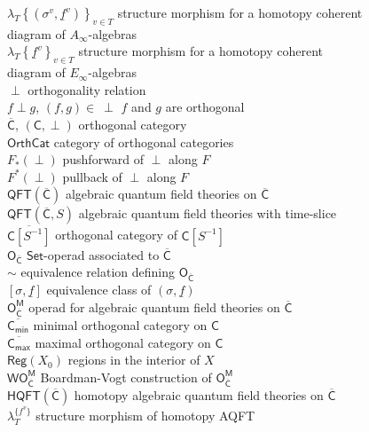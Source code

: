 \documentclass[11pt]{amsbook}
\numberwithin{section}{chapter}
\numberwithin{subsection}{section}
\numberwithin{equation}{section}
\theoremstyle{plain}
\theoremstyle{definition}
\newcommand{\C}{\mathsf{C}}
\newcommand{\M}{\mathsf{M}}
\renewcommand{\O}{\mathsf{O}}
\newcommand{\W}{\mathsf{W}}
\newcommand{\inv}[1]{{#1}^{-1}}
\newcommand{\perpen}{~\perp}
\newcommand{\Cbar}{\overline{\C}}
\newcommand{\Cbarmin}{\overline{\C_{\mathsf{min}}}}
\newcommand{\Cbarmax}{\overline{\C_{\mathsf{max}}}}
\newcommand{\Csinv}{\C[\inv{S}]}
\newcommand{\Csinvbar}{\overline{\Csinv}}
\newcommand{\Ocbar}{\O_{\Cbar}}
\newcommand{\Ocbarm}{\Ocbar^{\M}}
\newcommand{\Orthcat}{\mathsf{OrthCat}}
\newcommand{\QFT}{\mathsf{QFT}}
\newcommand{\HQFT}{\mathsf{HQFT}}
\newcommand{\Reg}{\mathsf{Reg}}
\newcommand{\Regxzero}{\Reg(X_0)}
\newcommand{\Set}{\mathsf{Set}}
\newcommand{\wocbarm}{\W\Ocbarm}
\newcommand{\uf}{\underline f}
\begin{document}
\begin{tabbing}
$\lambda_T\left\{(\sigma^v,\uf^v)\right\}_{v\in T}$  structure morphism for a homotopy coherent\\ \blob diagram of $A_\infty$-algebras\\
$\lambda_T\left\{\uf^v\right\}_{v\in T}$  structure morphism for a homotopy coherent\\ \blob diagram of $E_\infty$-algebras\\
$\perp$  orthogonality relation\\
$f \perp g$, $(f,g) \in \perpen$  $f$ and $g$ are orthogonal\\
$\Cbar$, $(\C,\perp)$  orthogonal category\\
$\Orthcat$  category of orthogonal categories\\
$F_*(\perp)$  pushforward of $\perp$ along $F$\\
$F^*(\perp)$  pullback of $\perp$ along $F$\\
$\QFT(\Cbar)$  algebraic quantum field theories on $\Cbar$\\
$\QFT(\Cbar,S)$  algebraic quantum field theories with time-slice\\
$\Csinvbar$  orthogonal category of $\Csinv$\\
$\Ocbar$  $\Set$-operad associated to $\Cbar$\\
$\sim$  equivalence relation defining $\Ocbar$\\
$[\sigma,\uf]$  equivalence class of $(\sigma,\uf)$\\
$\Ocbarm$  operad for algebraic quantum field theories on $\Cbar$\\
$\Cbarmin$  minimal orthogonal category on $\C$\\
$\Cbarmax$  maximal orthogonal category on $\C$\\
$\Regxzero$  regions in the interior of $X$\\
$\wocbarm$  Boardman-Vogt construction of $\Ocbarm$\\
$\HQFT(\Cbar)$  homotopy algebraic quantum field theories on $\Cbar$\\
$\lambda_T^{\{f^v\}}$  structure morphism of homotopy AQFT\\

\end{tabbing}
\end{document}
